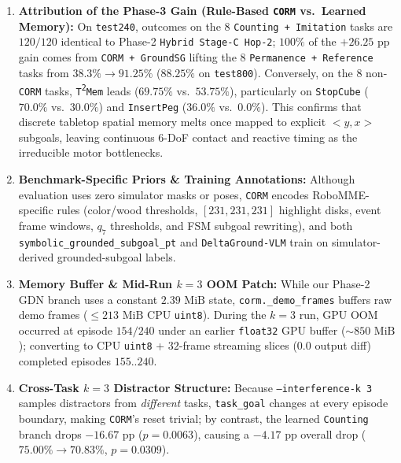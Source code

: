 \documentclass[10pt]{article}
\begin{document}
\begin{enumerate}[leftmargin=1.6em,nosep]
  \item \textbf{Attribution of the Phase-3 Gain (Rule-Based \texttt{CORM} vs.\ Learned Memory):} On \texttt{test240}, outcomes on the $8$ \texttt{Counting + Imitation} tasks are $120/120$ identical to Phase-2 \texttt{Hybrid Stage-C Hop-2}; $100\%$ of the $+26.25\text{ pp}$ gain comes from \texttt{CORM + GroundSG} lifting the $8$ \texttt{Permanence + Reference} tasks from $38.3\% \to 91.25\%$ ($88.25\%$ on \texttt{test800}). Conversely, on the $8$ non-\texttt{CORM} tasks, \texttt{T\textsuperscript{2}Mem} leads ($69.75\%$ vs.\ $53.75\%$), particularly on \texttt{StopCube} ($70.0\%$ vs.\ $30.0\%$) and \texttt{InsertPeg} ($36.0\%$ vs.\ $0.0\%$). This confirms that discrete tabletop spatial memory melts once mapped to explicit $<\!y,x\!>$ subgoals, leaving continuous 6-DoF contact and reactive timing as the irreducible motor bottlenecks.
  \item \textbf{Benchmark-Specific Priors \& Training Annotations:} Although evaluation uses zero simulator masks or poses, \texttt{CORM} encodes RoboMME-specific rules (color/wood thresholds, $[231,231,231]$ highlight disks, event frame windows, $q_7$ thresholds, and FSM subgoal rewriting), and both \texttt{symbolic\_grounded\_subgoal\_pt} and \texttt{DeltaGround-VLM} train on simulator-derived grounded-subgoal labels.
  \item \textbf{Memory Buffer \& Mid-Run $k=3$ OOM Patch:} While our Phase-2 GDN branch uses a constant $2.39\text{ MiB}$ state, \texttt{corm.\_demo\_frames} buffers raw demo frames ($\le 213\text{ MiB}$ CPU \texttt{uint8}). During the $k=3$ run, GPU OOM occurred at episode $154/240$ under an earlier \texttt{float32} GPU buffer ($\sim 850\text{ MiB}$); converting to CPU \texttt{uint8} + $32$-frame streaming slices ($0.0$ output diff) completed episodes $155..240$.
  \item \textbf{Cross-Task $k=3$ Distractor Structure:} Because \texttt{--interference-k 3} samples distractors from \emph{different} tasks, \texttt{task\_goal} changes at every episode boundary, making \texttt{CORM}'s reset trivial; by contrast, the learned \texttt{Counting} branch drops $-16.67\text{ pp}$ ($p=0.0063$), causing a $-4.17\text{ pp}$ overall drop ($75.00\% \to 70.83\%$, $p=0.0309$).
\end{enumerate}

\end{document}
